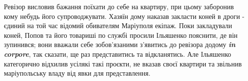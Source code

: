 \documentclass[a4paper,20pt]{report}
\begin{document}
Ревізор висловив бажання поїхати до себе на квартиру, при цьому заборонив кому небудь
його супроводжувати. Хазяїн дому наказав закласти коней в дроги - єдиний
на той час відомий обивателям Маріуполя екіпаж.
Поки закладували коней, Попов та його товариші по службі просили
Ільяшенко пояснити, де він зупинився; вони вважали себе зобов'язаними з'явитись до ревізора
додому \textbf{\em in corpore}, так сказати, ще раз представитись та відкланятись. Але Ільяшенко
категорично відхилив усілякі такі проєкти, не вказав своєї квартири та звільнив маріупольську владу
від явки для представлення.
\end{document}
